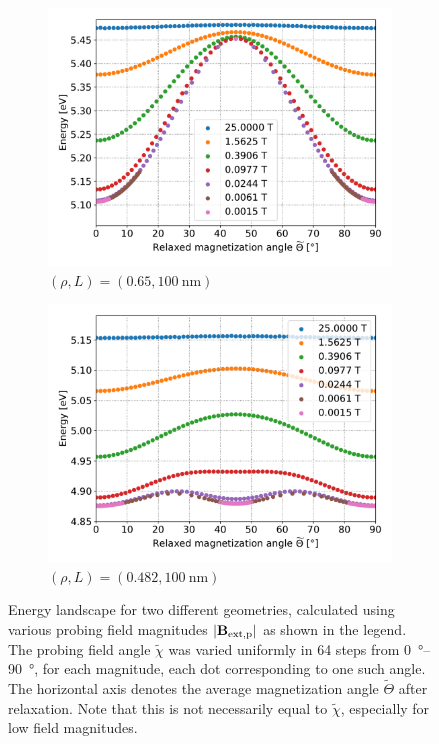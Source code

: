 \documentclass[11pt,a4paper,english,twoside]{article}
\begin{document}
\begin{figure}
     \centering
     \begin{subfigure}[b]{0.8\textwidth}
         \centering
         \includegraphics[width=\textwidth]{Figures/biaxial_island/BarrierLandscape/Plus_65_B25-0.001-div4_a128Pi_plotOptimized.pdf}
         \caption{$(\rho, L)=(0.65, \SI{100}{\nano\metre})$}
         \label{fig:barrierLandscape-sweepBext_r0.65}
     \end{subfigure}
     \begin{subfigure}[b]{0.8\textwidth}
         \centering
         \includegraphics[width=\textwidth]{Figures/biaxial_island/BarrierLandscape/Plus_48.2_B25-0.001-div4_a128Pi_plotOptimized.pdf}
         \caption{$(\rho, L)=(0.482, \SI{100}{\nano\metre})$}
         \label{fig:barrierLandscape-sweepBext_r0.482}
     \end{subfigure}
    \caption{Energy landscape for two different geometries, calculated using various probing field magnitudes $\abs{\vb{B_\mathrm{ext,p}}}$ as shown in the legend. The probing field angle $\widetilde{\chi}$ was varied uniformly in 64 steps from \SIrange{0}{90}{\degree}, for each magnitude, each dot corresponding to one such angle. The horizontal axis denotes the average magnetization angle $\widetilde{\Theta}$ after relaxation. Note that this is not necessarily equal to $\widetilde{\chi}$, especially for low field magnitudes.}
    \label{fig:barrierLandscape-sweepBext}
\end{figure}
\end{document}
